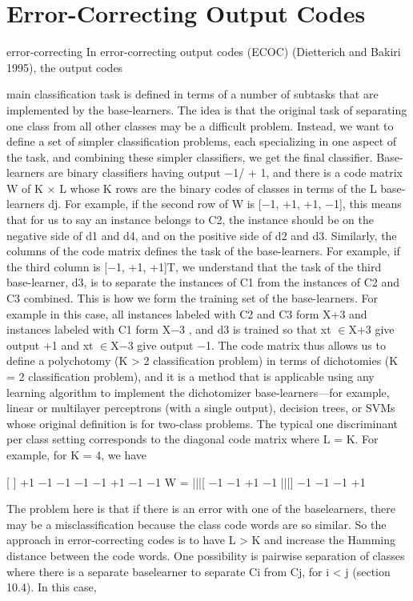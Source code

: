 \section{Error-Correcting Output Codes}

error-correcting In error-correcting output codes (ECOC) (Dietterich and Bakiri 1995), the output codes

main classification task is defined in terms of a number of subtasks that are implemented by the base-learners. The idea is that the original task of separating one class from all other classes may be a difficult problem. Instead, we want to define a set of simpler classification problems, each specializing in one aspect of the task, and combining these simpler classifiers, we get the final classifier. Base-learners are binary classifiers having output $-$1/ + 1, and there is a code matrix W of K $\times$ L whose K rows are the binary codes of classes in terms of the L base-learners dj. For example, if the second row of W is [$-$1, +1, +1, $-$1], this means that for us to say an instance belongs to C2, the instance should be on the negative side of d1 and d4, and on the positive side of d2 and d3. Similarly, the columns of the code matrix defines the task of the base-learners. For example, if the third column is [$-$1, +1, +1]T, we understand that the task of the third base-learner, d3, is to separate the instances of C1 from the instances of C2 and C3 combined. This is how we form the training set of the base-learners. For example in this case, all instances labeled with C2 and C3 form X+3 and instances labeled with C1 form X$-$3 , and d3 is trained so that xt $\in$X+3 give output +1 and xt $\in$X$-$3 give output $-$1. The code matrix thus allows us to define a polychotomy (K > 2 classification problem) in terms of dichotomies (K = 2 classification problem), and it is a method that is applicable using any learning algorithm to implement the dichotomizer base-learners---for example, linear or multilayer perceptrons (with a single output), decision trees, or SVMs whose original definition is for two-class problems. The typical one discriminant per class setting corresponds to the diagonal code matrix where L = K. For example, for K = 4, we have

[ ] +1 $-$1 $-$1 $-$1 $-$1 +1 $-$1 $-$1 W = |||[ $-$1 $-$1 +1 $-$1 |||] $-$1 $-$1 $-$1 +1

The problem here is that if there is an error with one of the baselearners, there may be a misclassification because the class code words are so similar. So the approach in error-correcting codes is to have L > K and increase the Hamming distance between the code words. One possibility is pairwise separation of classes where there is a separate baselearner to separate Ci from Cj, for i < j (section 10.4). In this case,

